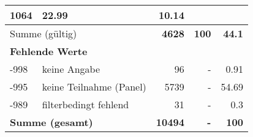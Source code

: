 \begin{longtable}{lXrrr}
       \num{1064} &
       \num[round-mode=places,round-precision=2]{22.99} &
         \num[round-mode=places,round-precision=2]{10.14} \\
     \midrule
     \multicolumn{2}{l}{Summe (gültig)} &
       \textbf{\num{4628}} &
     \textbf{\num{100}} &
       \textbf{\num[round-mode=places,round-precision=2]{44.1}} \\
     \multicolumn{5}{l}{\textbf{Fehlende Werte}}\\
       -998 &
       keine Angabe &
         \num{96} &
        - &
         \num[round-mode=places,round-precision=2]{0.91} \\
       -995 &
       keine Teilnahme (Panel) &
         \num{5739} &
        - &
         \num[round-mode=places,round-precision=2]{54.69} \\
       -989 &
       filterbedingt fehlend &
         \num{31} &
        - &
         \num[round-mode=places,round-precision=2]{0.3} \\
     \midrule
     \multicolumn{2}{l}{\textbf{Summe (gesamt)}} &
          \textbf{\num{10494}} &
        \textbf{-} &
        \textbf{\num{100}} \\
     \bottomrule
     \end{longtable}
     
